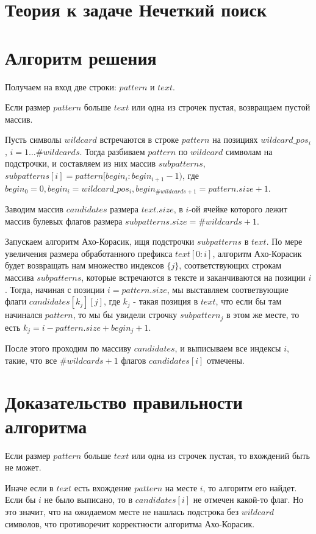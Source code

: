 \documentclass{article}
\begin{document}
\section*{Теория к задаче Нечеткий поиск}
\section{Алгоритм решения}

Получаем на вход две строки: $pattern$ и $text$.
\smallskip

Если размер $pattern$ больше $text$ или одна из строчек пустая, возвращаем пустой массив.
\smallskip

Пусть символы $wildcard$ встречаются в строке $pattern$ на позициях $wildcard\_pos_i$, $i=1 \dots \#wildcards$. Тогда разбиваем $pattern$ по $wildcard$ символам на подстрочки, и составляем из них массив
$subpatterns$, $subpatterns[i] = pattern[begin_i: begin_{i+1} - 1)$, где $begin_0 = 0, begin_{i} = wildcard\_pos_i, begin_{\#wildcards + 1} = pattern.size + 1$.
\smallskip

Заводим массив $candidates$ размера $text.size$, в $i$-ой ячейке которого лежит массив булевых флагов размера $subpatterns.size = \#wildcards + 1$.
\smallskip

Запускаем алгоритм Ахо-Корасик, ищя подстрочки $subpatterns$ в $text$.
По мере увеличения размера обработанного префикса $text[0:i]$, алгоритм Ахо-Корасик будет возвращать нам множество индексов $\{j\}$, соответствующих строкам массива $subpatterns$, которые встречаются в тексте и заканчиваются на позиции $i$. Тогда, начиная с позиции $i = pattern.size$, мы выставляем соответвующие флаги $candidates[k_j][j]$, где $k_j$ - такая позиция в $text$, что если бы там начинался $pattern$, то мы бы увидели строчку $subpattern_j$  в этом же месте, то есть $k_j = i - pattern.size + begin_j + 1$.
\smallskip

После этого проходим по массиву $candidates$, и выписываем все индексы $i$, такие, что все $\#wildcards + 1$ флагов $candidates[i]$ отмечены.

\section{Доказательство правильности алгоритма}

Если размер $pattern$ больше $text$ или одна из строчек пустая, то вхождений быть не может.
\smallskip

Иначе если в $text$ есть вхождение $pattern$ на месте $i$, то алгоритм его найдет. Если бы $i$ не было выписано, то в $candidates[i]$ не отмечен какой-то флаг. Но это значит, что на ожидаемом месте не нашлась подстрока без $wildcard$ символов, что противоречит корректности алгоритма Ахо-Корасик.
\smallskip
\end{document}

